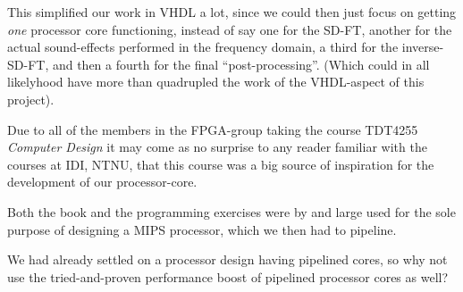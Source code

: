 This simplified our work in VHDL a lot, since we could then just focus on
getting \emph{one} processor core functioning, instead of say one for the SD-FT,
another for the actual sound-effects performed in the frequency domain, a third
for the inverse-SD-FT, and then a fourth for the final ``post-processing''.
(Which could in all likelyhood have more than quadrupled the work of the
VHDL-aspect of this project).

Due to all of the members in the FPGA-group taking the course TDT4255 \emph{
Computer Design}
it may come as no surprise to any reader familiar with the courses at IDI, NTNU,
that this course was a big source of inspiration for the development of our
processor-core.

Both the  book and the programming
exercises were by and large used for the sole purpose of designing a MIPS
processor, which we then had to pipeline.

We had already settled on a processor design having pipelined cores, so why not
use the tried-and-proven performance boost of pipelined processor cores as well?
